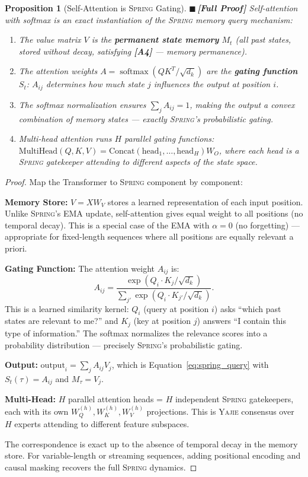 \documentclass[12pt,a4paper]{article}
\newtheorem{proposition}[theorem]{Proposition}
\theoremstyle{definition}
\newcommand{\rigorFull}{{\color{rigorcolor}$\blacksquare$\,\textbf{[Full Proof]}}}
\newcommand{\Yajie}{\textsc{Yajie}}
\newcommand{\Spring}{\textsc{Spring}}
\DeclareMathOperator{\softmax}{softmax}
\newcommand{\asmTag}[1]{\textsf{\textbf{[A#1]}}}
\begin{document}
\begin{proposition}[Self-Attention is \Spring{} Gating]\label{prop:attention_spring}
\rigorFull
Self-attention with softmax is an exact instantiation of the \Spring{} memory query mechanism:
\begin{enumerate}[label=(\roman*)]
    \item The value matrix $V$ is the \textbf{permanent state memory} $M_t$ (all past states, stored without decay, satisfying \asmTag{4} — memory permanence).
    \item The attention weights $A = \softmax(QK^T/\sqrt{d_k})$ are the \textbf{gating function} $S_t$: $A_{ij}$ determines how much state $j$ influences the output at position $i$.
    \item The softmax normalization ensures $\sum_j A_{ij} = 1$, making the output a convex combination of memory states — exactly \Spring{}'s probabilistic gating.
    \item Multi-head attention runs $H$ parallel gating functions: $\text{MultiHead}(Q,K,V) = \text{Concat}(\text{head}_1, \ldots, \text{head}_H)W_O$, where each head is a \Spring{} gatekeeper attending to different aspects of the state space.
\end{enumerate}
\end{proposition}

\begin{proof}
Map the Transformer to \Spring{} component by component:

\textbf{Memory Store:} $V = XW_V$ stores a learned representation of each input position. Unlike \Spring{}'s EMA update, self-attention gives equal weight to all positions (no temporal decay). This is a special case of the EMA with $\alpha = 0$ (no forgetting) — appropriate for fixed-length sequences where all positions are equally relevant a priori.

\textbf{Gating Function:} The attention weight $A_{ij}$ is:
\begin{equation}
    A_{ij} = \frac{\exp(Q_i \cdot K_j / \sqrt{d_k})}{\sum_{j'} \exp(Q_i \cdot K_{j'} / \sqrt{d_k})}.
\end{equation}
This is a learned similarity kernel: $Q_i$ (query at position $i$) asks ``which past states are relevant to me?'' and $K_j$ (key at position $j$) answers ``I contain this type of information.'' The softmax normalizes the relevance scores into a probability distribution — precisely \Spring{}'s probabilistic gating.

\textbf{Output:} $\text{output}_i = \sum_j A_{ij} V_j$, which is Equation~\ref{eq:spring_query} with $S_t(\tau) = A_{ij}$ and $M_\tau = V_j$.

\textbf{Multi-Head:} $H$ parallel attention heads = $H$ independent \Spring{} gatekeepers, each with its own $W_Q^{(h)}, W_K^{(h)}, W_V^{(h)}$ projections. This is \Yajie{} consensus over $H$ experts attending to different feature subspaces.

The correspondence is exact up to the absence of temporal decay in the memory store. For variable-length or streaming sequences, adding positional encoding and causal masking recovers the full \Spring{} dynamics.
\end{proof}
\end{document}

